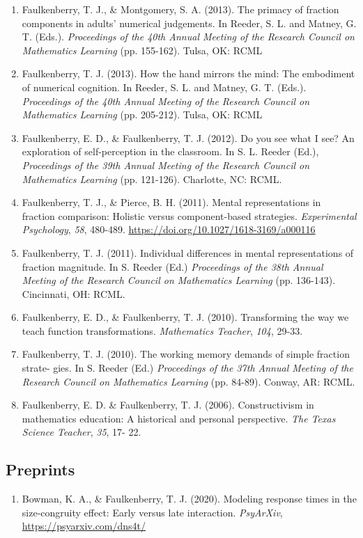 \documentclass[article,10pt]{article}
\begin{document}
\begin{enumerate}
\item Faulkenberry, T. J., \& Montgomery, S. A. (2013). The primacy of fraction components in adults’ numerical judgements. In Reeder, S. L. and Matney, G. T. (Eds.). \emph{Proceedings of the 40th Annual Meeting of the Research Council on Mathematics Learning} (pp. 155-162). Tulsa, OK: RCML
\item Faulkenberry, T. J. (2013). How the hand mirrors the mind: The embodiment of numerical cognition. In Reeder, S. L. and Matney, G. T. (Eds.). \emph{Proceedings of the 40th Annual Meeting of the Research Council on Mathematics Learning} (pp. 205-212). Tulsa, OK: RCML
\item Faulkenberry, E. D., \& Faulkenberry, T. J. (2012). Do you see what I see? An exploration of self-perception in the classroom. In S. L. Reeder (Ed.), \emph{Proceedings of the 39th Annual Meeting of the Research Council on Mathematics Learning} (pp. 121-126). Charlotte, NC: RCML.
\item Faulkenberry, T. J., \& Pierce, B. H. (2011). Mental representations in fraction comparison: Holistic versus component-based strategies. \emph{Experimental Psychology}, \emph{58}, 480-489. \url{https://doi.org/}\href{http://dx.doi.org/10.1027/1618-3169/a000116}{10.1027/1618-3169/a000116}
\item Faulkenberry, T. J. (2011). Individual differences in mental representations of fraction magnitude. In S. Reeder (Ed.) \emph{Proceedings of the 38th Annual Meeting of the Research Council on Mathematics Learning} (pp. 136-143). Cincinnati, OH: RCML.
\item Faulkenberry, E. D., \& Faulkenberry, T. J. (2010). Transforming the way we teach function transformations. \emph{Mathematics Teacher}, \emph{104}, 29-33.
\item Faulkenberry, T. J. (2010). The working memory demands of simple fraction strate- gies. In S. Reeder (Ed.) \emph{Proceedings of the 37th Annual Meeting of the Research Council on Mathematics Learning} (pp. 84-89). Conway, AR: RCML.
\item Faulkenberry, E. D. \& Faulkenberry, T. J. (2006). Constructivism in mathematics education: A historical and personal perspective. \emph{The Texas Science Teacher}, \emph{35}, 17- 22.
\end{enumerate}

\subsection*{Preprints}
\label{sec:org7e578f0}
\begin{enumerate}
\item Bowman, K. A., \& Faulkenberry, T. J. (2020). Modeling response times in the size-congruity effect: Early versus late interaction. \emph{PsyArXiv}, \url{https://psyarxiv.com/dns4t/}
\end{enumerate}
\end{document}
